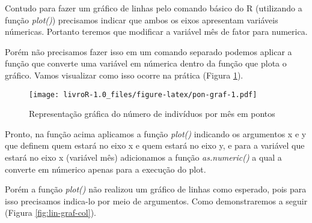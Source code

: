 \documentclass[]{book}
\newenvironment{Shaded}{\begin{snugshade}}{\end{snugshade}}
\newcommand{\DataTypeTok}[1]{\textcolor[rgb]{0.13,0.29,0.53}{#1}}
\newcommand{\KeywordTok}[1]{\textcolor[rgb]{0.13,0.29,0.53}{\textbf{#1}}}
\newcommand{\NormalTok}[1]{#1}
\newcommand{\OperatorTok}[1]{\textcolor[rgb]{0.81,0.36,0.00}{\textbf{#1}}}
\newcommand{\StringTok}[1]{\textcolor[rgb]{0.31,0.60,0.02}{#1}}
\begin{document}
Contudo para fazer um gráfico de linhas pelo comando básico do R (utilizando a função \emph{plot()}) precisamos indicar que ambos os eixos apresentam variáveis númericas. Portanto teremos que modificar a variável mês de fator para numerica.

Porém não precisamos fazer isso em um comando separado podemos aplicar a função que converte uma variável em númerica dentro da função que plota o gráfico. Vamos visualizar como isso ocorre na prática (Figura \ref{fig:pon-graf}).

\begin{Shaded}
\end{Shaded}

\begin{figure}
\centering
\texttt{[image: livroR-1.0\_files/figure-latex/pon-graf-1.pdf]}
\caption{\label{fig:pon-graf}Representação gráfica do número de indivíduos por mês em pontos}
\end{figure}

Pronto, na função acima aplicamos a função \emph{plot()} indicando os argumentos x e y que definem quem estará no eixo x e quem estará no eixo y, e para a variável que estará no eixo x (variável mês) adicionamos a função \emph{as.numeric()} a qual a converte em númerico apenas para a execução do plot.

Porém a função \emph{plot()} não realizou um gráfico de linhas como esperado, pois para isso precisamos indica-lo por meio de argumentos. Como demonstraremos a seguir (Figura \ref{fig:lin-graf-col}).

\begin{Shaded}
\end{Shaded}
\end{document}
